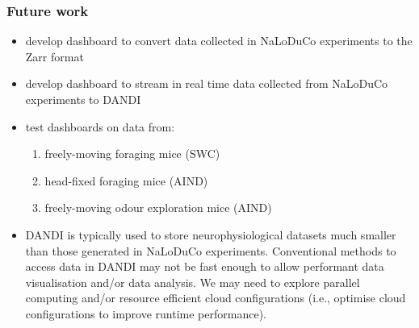 \begin{frame}
    \frametitle{Future work}

    \begin{itemize}

        \item develop dashboard to convert data collected in NaLoDuCo
            experiments to the Zarr format

        \item develop dashboard to stream in real time data collected from
            NaLoDuCo experiments to DANDI

        \item test dashboards on data from:

        \begin{enumerate}

            \item freely-moving foraging mice (SWC)

            \item head-fixed foraging mice (AIND)

            \item freely-moving odour exploration mice (AIND)

        \end{enumerate}

        \item DANDI is typically used to store neurophysiological datasets much
        smaller than those generated in NaLoDuCo experiments. Conventional
        methods to access data in DANDI may not be fast enough to allow
        performant data visualisation and/or data analysis. We may need to
        explore parallel computing and/or resource efficient cloud
        configurations (i.e., optimise cloud configurations to improve runtime
        performance).

    \end{itemize}

\end{frame}
